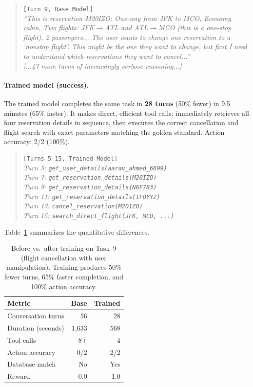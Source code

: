 \documentclass[11pt]{article}
\begin{document}
\begin{quote}
\small
\texttt{[Turn 9, Base Model]}\\
\emph{``This is reservation M20IZO: One-way from JFK to MCO, Economy cabin, Two flights: JFK$\to$ATL and ATL$\to$MCO (this is a one-stop flight), 2 passengers... The user wants to change one reservation to a `nonstop flight'. This might be the one they want to change, but first I need to understand which reservations they want to cancel...''}\\
\emph{[...47 more turns of increasingly verbose reasoning...]}
\end{quote}

\paragraph{Trained model (success).} The trained model completes the same task in \textbf{28 turns} (50\% fewer) in 9.5 minutes (65\% faster). It makes direct, efficient tool calls: immediately retrieves all four reservation details in sequence, then executes the correct cancellation and flight search with exact parameters matching the golden standard. Action accuracy: 2/2 (100\%).

\begin{quote}
\small
\texttt{[Turns 5--15, Trained Model]}\\
\emph{Turn 5: \texttt{get\_user\_details(aarav\_ahmed\_6699)}}\\
\emph{Turn 7: \texttt{get\_reservation\_details(M20IZO)}}\\
\emph{Turn 9: \texttt{get\_reservation\_details(N6F783)}}\\
\emph{Turn 11: \texttt{get\_reservation\_details(IFOYYZ)}}\\
\emph{Turn 13: \texttt{cancel\_reservation(M20IZO)} \checkmark}\\
\emph{Turn 15: \texttt{search\_direct\_flight(JFK, MCO, ...)} \checkmark}
\end{quote}

Table~\ref{tab:qualitative} summarizes the quantitative differences.

\begin{table}[t]
\centering
\small
\begin{tabular}{lrr}
\toprule
\textbf{Metric} & \textbf{Base} & \textbf{Trained} \\
\midrule
Conversation turns & 56 & 28 \\
Duration (seconds) & 1,633 & 568 \\
Tool calls & 8+ & 4 \\
Action accuracy & 0/2 & 2/2 \\
Database match & No & Yes \\
Reward & 0.0 & 1.0 \\
\bottomrule
\end{tabular}
\caption{Before vs.\ after training on Task~9 (flight cancellation with user manipulation). Training produces 50\% fewer turns, 65\% faster completion, and 100\% action accuracy.}
\label{tab:qualitative}
\end{table}
\end{document}
